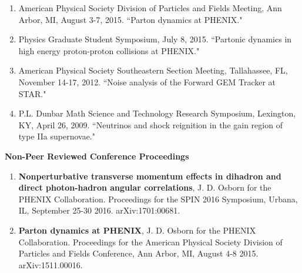 \documentclass[11pt]{article}
\begin{document}
\begin{flushleft}
\begin{enumerate}
		\item American Physical Society Division of Particles and Fields Meeting, Ann Arbor, MI, August 3-7, 2015. ``Parton dynamics at PHENIX." 
		
		\item Physics Graduate Student Symposium, July 8, 2015.  ``Partonic dynamics in high energy proton-proton collisions at PHENIX." 
		
		\item American Physical Society Southeastern Section Meeting, Tallahassee, FL, November 14-17, 2012.  ``Noise analysis of the Forward GEM Tracker at STAR." 
		
		\item P.L. Dunbar Math Science and Technology Research Symposium, Lexington, KY, April 26, 2009. ``Neutrinos and shock reignition in the gain region of type IIa supernovae."
	\end{enumerate}
	
\end{flushleft}

\vspace{7pt}







\vspace{0.5cm}
\begin{flushleft}
	\Large\textbf{Non-Peer Reviewed Conference Proceedings} \\
	\normalsize 
	\begin{enumerate}
		\item \textbf{Nonperturbative transverse momentum effects in dihadron and direct photon-hadron angular correlations}, J. D. Osborn for the PHENIX Collaboration. Proceedings for the SPIN 2016 Symposium, Urbana, IL, September 25-30 2016. arXiv:1701:00681.
		\item \textbf{Parton dynamics at PHENIX}, J. D. Osborn for the PHENIX Collaboration. Proceedings for the American Physical Society Division of Particles and Fields Conference, Ann Arbor, MI, August 4-8 2015. arXiv:1511.00016. 
		
	\end{enumerate}
\end{flushleft}


\vspace{7pt}
\end{document}
